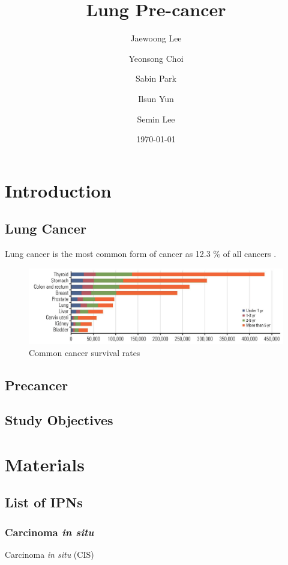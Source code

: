 \documentclass[a4paper]{article}
\title{Lung Pre-cancer}
\author{
    Jaewoong Lee
    \and
    Yeonsong Choi
    \and
    Sabin Park
    \and
    Ilsun Yun
    \and
    Semin Lee
}
\date{\today}
\begin{document}
    \maketitle
    \newpage

    \tableofcontents
    \listoftables
    \listoffigures
    \newpage

    \section{Introduction}
        \subsection{Lung Cancer}
            Lung cancer is the most common form of cancer as 12.3 \% of all cancers \cite{lung3}.

            \begin{figure}[ht]
                \centering
                \includegraphics[width=0.8 \linewidth]{figures/LungCancer/rate.png}
                \caption{Common cancer survival rates \protect\cite{lung6}}
            \end{figure}
        \subsection{Precancer}

        \subsection{Study Objectives}

    \section{Materials}
        \subsection{List of IPNs}
            \subsubsection{Carcinoma \textit{in situ}}
                Carcinoma \textit{in situ} (CIS)
\end{document}
